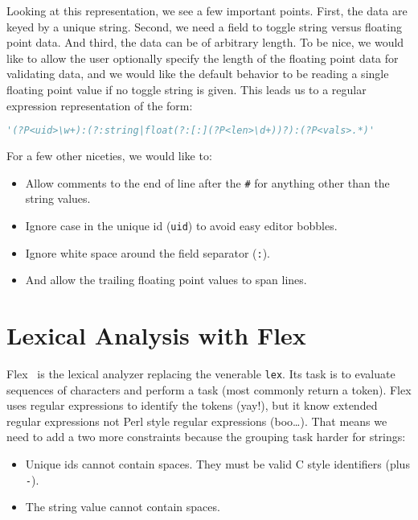 \documentclass{article}
\begin{document}
Looking at this representation, we see a few important points.  First,
the data are keyed by a unique string.  Second, we need a field to
toggle string versus floating point data.  And third, the data can be of
arbitrary length.  To be nice, we would like to allow the user
optionally specify the length of the floating point data for validating
data, and we would like the default behavior to be reading a single
floating point value if no toggle string is given.  This leads us to a
regular expression representation of the form:

\begin{lstlisting}[language=Python]
'(?P<uid>\w+):(?:string|float(?:[:](?P<len>\d+))?):(?P<vals>.*)'
\end{lstlisting}

For a few other niceties, we would like to:

\begin{itemize}
    \item   Allow comments to the end of line after the \lstinline{#}
        for anything other than the string values.
    \item   Ignore case in the unique id (\lstinline{uid}) to avoid easy
        editor bobbles.
    \item   Ignore white space around the field separator
        (\lstinline{:}).
    \item   And allow the trailing floating point values to span lines.
\end{itemize}

\section{Lexical Analysis with Flex}

Flex~\cite{westes_flex_2001} is the lexical analyzer
replacing the venerable \lstinline{lex}.  Its task is to evaluate
sequences of characters and perform a task (most commonly return a
token).  Flex uses regular expressions to identify the tokens (yay!),
but it know extended regular expressions not Perl style regular
expressions (boo…).  That means we need to add a two more constraints
because the grouping task harder for strings:

\begin{itemize}
    \item   Unique ids cannot contain spaces.  They must be valid C
        style identifiers (plus \lstinline{-}).
    \item   The string value cannot contain spaces.
\end{itemize}
\end{document}
